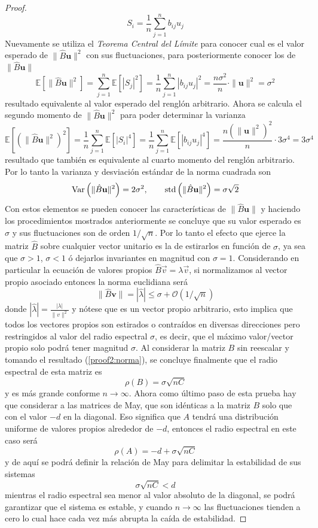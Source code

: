 \begin{proposición}
\begin{proof}
		$$S_i = \frac{1}{n}\sum_{j=1}^n b_{ij}u_j$$
		Nuevamente se utiliza el \textit{Teorema Central del Límite} para conocer cual es el valor esperado de $\|\hat{B}\textbf{u}\|^2$ con sus fluctuaciones, para posteriormente conocer los de $\|\hat{B}\textbf{u}\|$
		$$\mathbb{E}[\|\hat{B}\textbf{u}\|^2]=\sum_{j=1}^n\mathbb{E}[|S_j|^2]=\frac{1}{n}\sum_{j=1}^n|b_{ij}u_j|^2=\frac{n\sigma^2}{n}\cdot\|\textbf{u}\|^2=\sigma^2$$
		resultado equivalente al valor esperado del renglón arbitrario. Ahora se calcula el segundo momento de $\|\hat{B}\textbf{u}\|^2$ para poder determinar la varianza 
		$$\mathbb{E}\left [\left (\|\hat{B}\textbf{u}\|^2\right )^2\right ]=\frac{1}{n}\sum_{j=1}^n\mathbb{E}\left [|S_i|^4\right ]=\frac{1}{n}\sum_{j=1}^n\mathbb{E}\left [|b_{ij}u_j|^4\right ]=\frac{n\left (\|\textbf{u}\|^2\right )^2}{n}\cdot3\sigma^4=3\sigma^4$$
		resultado que también es equivalente al cuarto momento del renglón arbitrario. Por lo tanto la varianza y desviación estándar de la norma cuadrada son 
		$$\mathrm{Var}\left (\|\hat{B}\textbf{u}\|^2\right )=2\sigma^2,\qquad\text{std}\left (\|\hat{B}\textbf{u}\|^2\right )=\sigma\sqrt{2}$$
		Con estos elementos se pueden conocer las características de $\|\hat{B}\textbf{u}\|$ y haciendo los procedimientos mostrados anteriormente se concluye que su valor esperado es $\sigma$ y sus fluctuaciones son de orden $1/\sqrt{n}$. Por lo tanto el efecto que ejerce la matriz $\hat{B}$ sobre cualquier vector unitario es la de estirarlos en función de $\sigma$, ya sea que $\sigma>1$, $\sigma<1$ ó dejarlos invariantes en magnitud con $\sigma=1$.
		\newpage
		Considerando en particular la ecuación de valores propios $\hat{B}\vec{v}=\lambda\vec{v}$, si normalizamos al vector propio asociado entonces la norma euclidiana será 
		$$\|\hat{B}\textbf{v}\|=|\hat{\lambda}|\leq\sigma+\mathcal{O}(1/\sqrt{n})$$
		donde $|\hat{\lambda}|=\frac{|\lambda|}{\|v\|^2}$ y nótese que es un vector propio arbitrario, esto implica que todos los vectores propios son estirados o contraídos en diversas direcciones pero restringidos al valor del radio espectral $\sigma$, es decir, que el máximo valor/vector propio solo podrá tener magnitud $\sigma$. Al considerar la matriz $B$ sin reescalar y tomando el resultado (\ref{proof2:norma}), se concluye finalmente que el radio espectral de esta matriz es
		$$\rho(B)=\sigma\sqrt{nC}$$
		y es más grande conforme $n\to\infty$. Ahora como último paso de esta prueba hay que considerar a las matrices de May, que son idénticas a la matriz $B$ solo que con el valor $-d$ en la diagonal. Eso significa que $A$ tendrá una distribución uniforme de valores propios alrededor de $-d$, entonces el radio espectral en este caso será
		$$\rho(A)=-d+\sigma\sqrt{nC}$$
		y de aquí se podrá definir la relación de May para delimitar la estabilidad de sus sistemas
		\begin{equation}\label{eqn:radioMayGirko}
			\sigma\sqrt{nC}<d
		\end{equation}
		mientras el radio espectral sea menor al valor absoluto de la diagonal, se podrá garantizar que el sistema es estable, y cuando $n\to\infty$ las fluctuaciones tienden a cero lo cual hace cada vez más abrupta la caída de estabilidad.
		\end{proof}
\end{proposición}

